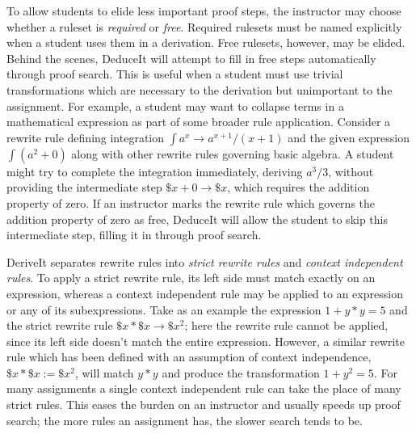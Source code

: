 \documentclass{sigchi}
\newcommand{\msb}[1]{\textbf{\textcolor{cyan}{Michael: #1}}}
\begin{document}
To allow students to elide less important proof steps, the instructor may choose whether a ruleset is \emph{required} or \emph{free}. Required rulesets must be named explicitly when a student uses them in a derivation. Free rulesets, however, may be elided. Behind the scenes, DeduceIt will attempt to fill in free steps automatically through proof search. This is useful when a student must use trivial transformations which are necessary to the derivation but unimportant to the assignment. For example, a student may want to collapse terms in a mathematical expression as part of some broader rule application. Consider a rewrite rule defining integration $\int{a^x} \rightarrow a^{x+1}/(x+1)$ and the given expression $\int{(a^2+0)}$ along with other rewrite rules governing basic algebra. A student might try to complete the integration immediately, deriving $a^3/3$, without providing the intermediate step $\$x+0 \rightarrow \$x$, which requires the addition property of zero. If an instructor marks the rewrite rule which governs the addition property of zero as free, DeduceIt will allow the student to skip this intermediate step, filling it in through proof search. %

DeriveIt separates rewrite rules into \emph{strict rewrite rules} and \emph{context independent rules}. To apply a strict rewrite rule, its left side must match exactly on an expression, whereas a context independent rule may be applied to an expression or any of its subexpressions. Take as an example the expression $1+y*y=5$ and the strict rewrite rule $\$x*\$x \rightarrow \$x^2$; here the rewrite rule cannot be applied, since its left side doesn't match the entire expression. However, a similar rewrite rule which has been defined with an assumption of context independence, $\$x*\$x := \$x^2$, will match $y*y$ and produce the transformation $1+y^2=5$. For many assignments a single context independent rule can take the place of many strict rules. This eases the burden on an instructor and usually speeds up proof search; the more rules an assignment has, the slower search tends to be.
\end{document}
